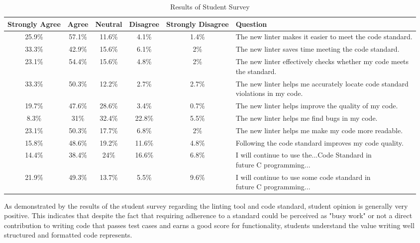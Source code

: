 \documentclass[sigconf]{acmart}
\begin{document}
\begin{table*}[t]
  \centering
  \begin{tabular}{cccccl}
    Strongly Agree & Agree & Neutral & Disagree & Strongly Disagree & Question \\
    \hline
    25.9\% & 57.1\% & 11.6\% & 4.1\%  & 1.4\% & The new linter makes it easier to meet the code standard. \\
    \hline
    33.3\% & 42.9\% & 15.6\% & 6.1\%  & 2\%   & The new linter saves time meeting the code standard. \\
    \hline
    23.1\% & 54.4\% & 15.6\% & 4.8\%  & 2\%   & \makecell{The new linter effectively checks whether my code meets \\ the standard.} \\
    \hline
    33.3\% & 50.3\% & 12.2\% & 2.7\%  & 2.7\% & \makecell{The new linter helps me accurately locate code standard \\ violations in my code.} \\
    \hline
    19.7\% & 47.6\% & 28.6\% & 3.4\%  & 0.7\% & The new linter helps improve the quality of my code. \\
    \hline
    8.3\%  & 31\%   & 32.4\% & 22.8\% & 5.5\% & The new linter helps me find bugs in my code. \\
    \hline
    23.1\% & 50.3\% & 17.7\% & 6.8\%  & 2\%   & The new linter helps me make my code more readable. \\
    \hline
    15.8\% & 48.6\% & 19.2\% & 11.6\% & 4.8\% & Following the code standard improves my code quality. \\
    \hline
    14.4\% & 38.4\% & 24\% & 16.6\% & 6.8\% & \makecell{I will continue to use the...Code Standard in \\ future C programming...} \\
    \hline
    21.9\% & 49.3\% & 13.7\% & 5.5\% & 9.6\% & \makecell{I will continue to use some code standard in \\ future C programming...} \\
    \hline
  \end{tabular}
  \caption{Results of Student Survey}
\end{table*}

As demonstrated by the results of the student survey regarding the linting tool and code
standard, student opinion is generally very positive. This indicates that despite
the fact that requiring adherence to a standard could be perceived as "busy work" or not
a direct contribution to writing code that passes test cases and earns a good score for
functionality, students understand the value writing well structured and formatted
code represents.
\\
\end{document}
